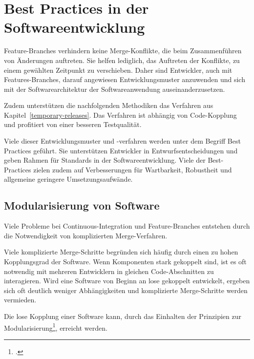\section{Best Practices in der Softwareentwicklung}

Feature-Branches verhindern keine Merge-Konflikte, die beim Zusammenführen von Änderungen auftreten. Sie helfen lediglich, das Auftreten der Konflikte, zu einem gewählten Zeitpunkt zu verschieben. Daher sind Entwickler, auch mit Features-Branches, darauf angewiesen Entwicklungsmuster anzuwenden und sich mit der Softwarearchitektur der Softwareanwendung auseinanderzusetzen.

Zudem unterstützen die nachfolgenden Methodiken das Verfahren \glqq {}\grqq{} aus Kapitel~\ref{temporary-releases}. Das Verfahren ist abhängig von Code-Kopplung und profitiert von einer besseren Testqualität.

Viele dieser Entwicklungsmuster und -verfahren werden unter dem Begriff \glqq Best Practices\grqq{} geführt. Sie unterstützen Entwickler in Entwurfsentscheidungen und geben Rahmen für Standards in der Softwareentwicklung. Viele der Best-Practices zielen zudem auf Verbesserungen für Wartbarkeit, Robustheit und allgemeine geringere Umsetzungsaufwände.

\subsection{Modularisierung von Software}

Viele Probleme bei Continuous-Integration und Feature-Branches entstehen durch die Notwendigkeit von komplizierten Merge-Verfahren. 



Viele komplizierte Merge-Schritte begründen sich häufig durch einen zu hohen Kopplungsgrad der Software. Wenn Komponenten stark gekoppelt sind, ist es oft notwendig mit mehreren Entwicklern in gleichen Code-Abschnitten zu interagieren. Wird eine Software von Beginn an lose gekoppelt entwickelt, ergeben sich oft deutlich weniger Abhängigkeiten und komplizierte Merge-Schritte werden vermieden.

Die lose Kopplung einer Software kann, durch das Einhalten der Prinzipien zur Modularisierung\footcite{2012-barth-modularisation}, erreicht werden. 

